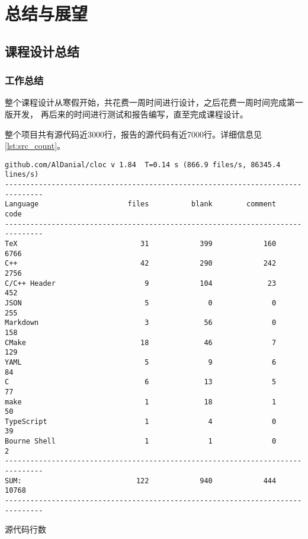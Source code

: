 \chapter{总结与展望}

\section{课程设计总结}

\subsection{工作总结}

整个课程设计从寒假开始，共花费一周时间进行设计，之后花费一周时间完成第一版开发，
再后来的时间进行测试和报告编写，直至\zhtoday{}完成课程设计。

整个项目共有源代码近3000行，报告的源代码有近7000行。详细信息见\autoref{lst:src_count}。

\begin{listing}[hbt]
	\scriptsize
\begin{verbatim}
github.com/AlDanial/cloc v 1.84  T=0.14 s (866.9 files/s, 86345.4 lines/s)
-------------------------------------------------------------------------------
Language                     files          blank        comment           code
-------------------------------------------------------------------------------
TeX                             31            399            160           6766
C++                             42            290            242           2756
C/C++ Header                     9            104             23            452
JSON                             5              0              0            255
Markdown                         3             56              0            158
CMake                           18             46              7            129
YAML                             5              9              6             84
C                                6             13              5             77
make                             1             18              1             50
TypeScript                       1              4              0             39
Bourne Shell                     1              1              0              2
-------------------------------------------------------------------------------
SUM:                           122            940            444          10768
-------------------------------------------------------------------------------
\end{verbatim}
\caption{源代码行数}\label{lst:src_count}
\end{listing}


